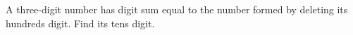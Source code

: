 A three-digit number has digit sum equal to the number formed by deleting its hundreds digit. Find its tens digit.
